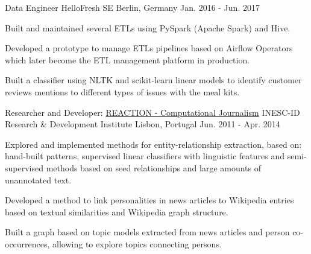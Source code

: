 \begin{cventries}
  \cventry
    {Data Engineer} %
    {HelloFresh SE} %
    {Berlin, Germany} %
    {Jan. 2016 - Jun. 2017} %
    {
      \begin{cvitems} %
        \item {Built and maintained several ETLs using PySpark (Apache Spark) and Hive.}
        \item {Developed a prototype to manage ETLs pipelines based on Airflow Operators which later become the ETL management platform in production.}
        \item {Built a classifier using NLTK and scikit-learn linear models to identify customer reviews mentions to different types of issues with the meal kits.}
      \end{cvitems}
    }
	
  \cventry
    {Researcher and Developer: \href{http://arquivo.pt/wayback/20151118124735/http://dmir.inesc-id.pt/project/Reaction}{REACTION - Computational Journalism}} %
    {INESC-ID Research \& Development Institute} %
    {Lisbon, Portugal} %
    {Jun. 2011 - Apr. 2014} %
    {
      \begin{cvitems} %
        \item {Explored and implemented methods for entity-relationship extraction, based on: hand-built patterns, supervised linear classifiers with linguistic features and semi-supervised methods based on seed relationships and large amounts of unannotated text.}
        \item {Developed a method to link personalities in news articles to Wikipedia entries based on textual similarities and Wikipedia graph structure.}
        \item {Built a graph based on topic models extracted from news articles and person co-occurrences, allowing to explore topics connecting persons.}
      \end{cvitems}
    }



\end{cventries}
